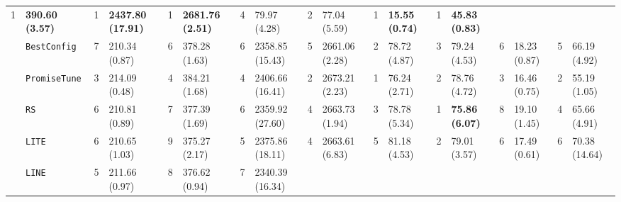 \begin{tabular}{clllllllllllllllll}
  \cellcolor{blue!15}1 &
  \multicolumn{1}{l|}{\cellcolor{blue!15}\textbf{390.60 (3.57)}} &
  \cellcolor{blue!15}1 &
  \multicolumn{1}{l|}{\cellcolor{blue!15}\textbf{2437.80 (17.91)}} &
  \cellcolor{blue!15}1 &
  \multicolumn{1}{l|}{\cellcolor{blue!15}\textbf{2681.76 (2.51)}} &
  4 &
  \multicolumn{1}{l|}{79.97 (4.28)} &
  2 &
  \multicolumn{1}{l|}{77.04 (5.59)} &
  \cellcolor{blue!15}1 &
  \multicolumn{1}{l|}{\cellcolor{blue!15}\textbf{15.55 (0.74)}} &
  \cellcolor{blue!15}1 &
  \cellcolor{blue!15}\textbf{45.83 (0.83)} \\
\multicolumn{1}{c|}{} &
  \multicolumn{1}{l|}{\texttt{BestConfig}} &
  7 &
  \multicolumn{1}{l|}{210.34 (0.87)} &
  6 &
  \multicolumn{1}{l|}{378.28 (1.63)} &
  6 &
  \multicolumn{1}{l|}{2358.85 (15.43)} &
  5 &
  \multicolumn{1}{l|}{2661.06 (2.28)} &
  2 &
  \multicolumn{1}{l|}{78.72 (4.87)} &
  3 &
  \multicolumn{1}{l|}{79.24 (4.53)} &
  6 &
  \multicolumn{1}{l|}{18.23 (0.87)} &
  5 &
  66.19 (4.92) \\
\multicolumn{1}{c|}{} &
  \multicolumn{1}{l|}{\texttt{PromiseTune}} &
  3 &
  \multicolumn{1}{l|}{214.09 (0.48)} &
  4 &
  \multicolumn{1}{l|}{384.21 (1.68)} &
  4 &
  \multicolumn{1}{l|}{2406.66 (16.41)} &
  2 &
  \multicolumn{1}{l|}{2673.21 (2.23)} &
  \cellcolor{blue!15}1 &
  \multicolumn{1}{l|}{\cellcolor{blue!15}76.24 (2.71)} &
  2 &
  \multicolumn{1}{l|}{78.76 (4.72)} &
  3 &
  \multicolumn{1}{l|}{16.46 (0.75)} &
  2 &
  55.19 (1.05) \\
\multicolumn{1}{c|}{} &
  \multicolumn{1}{l|}{\texttt{RS}} &
  6 &
  \multicolumn{1}{l|}{210.81 (0.89)} &
  7 &
  \multicolumn{1}{l|}{377.39 (1.69)} &
  6 &
  \multicolumn{1}{l|}{2359.92 (27.60)} &
  4 &
  \multicolumn{1}{l|}{2663.73 (1.94)} &
  3 &
  \multicolumn{1}{l|}{78.78 (5.34)} &
  \cellcolor{blue!15}1 &
  \multicolumn{1}{l|}{\cellcolor{blue!15}\textbf{75.86 (6.07)}} &
  8 &
  \multicolumn{1}{l|}{19.10 (1.45)} &
  4 &
  65.66 (4.91) \\
\multicolumn{1}{c|}{} &
  \multicolumn{1}{l|}{\texttt{LITE}} &
  6 &
  \multicolumn{1}{l|}{210.65 (1.03)} &
  9 &
  \multicolumn{1}{l|}{375.27 (2.17)} &
  5 &
  \multicolumn{1}{l|}{2375.86 (18.11)} &
  4 &
  \multicolumn{1}{l|}{2663.61 (6.83)} &
  5 &
  \multicolumn{1}{l|}{81.18 (4.53)} &
  2 &
  \multicolumn{1}{l|}{79.01 (3.57)} &
  6 &
  \multicolumn{1}{l|}{17.49 (0.61)} &
  6 &
  70.38 (14.64) \\
\multicolumn{1}{c|}{} &
  \multicolumn{1}{l|}{\texttt{LINE}} &
  5 &
  \multicolumn{1}{l|}{211.66 (0.97)} &
  8 &
  \multicolumn{1}{l|}{376.62 (0.94)} &
  7 &
  \multicolumn{1}{l|}{2340.39 (16.34)} &

\end{tabular}
